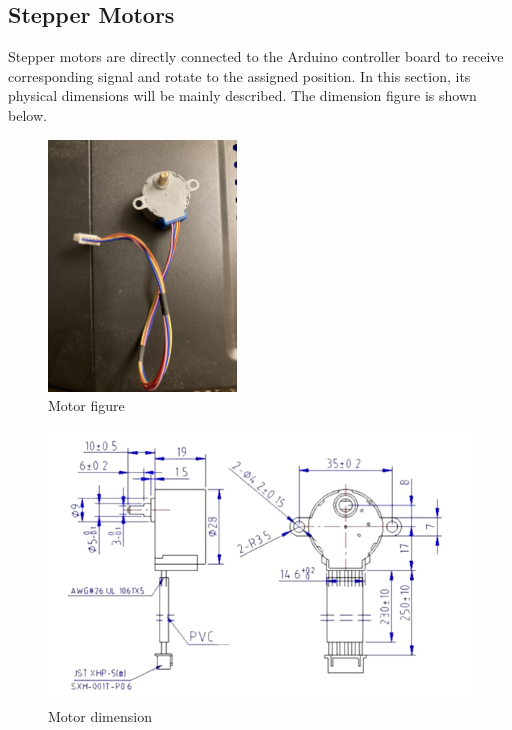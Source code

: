 \documentclass[12pt, titlepage]{article}
\begin{document}
\subsection{Stepper Motors}
Stepper motors are directly connected to the Arduino controller board to receive corresponding signal and rotate to the assigned position. In this section, its physical dimensions will be mainly described. The dimension figure is shown below.
\begin{figure}[H]
\caption{Motor figure}
\centering
\includegraphics[width=5cm]{motor_figure.jpg}
\end{figure}
\begin{figure}[H]
\caption{Motor dimension}
\centering
\includegraphics[width=\textwidth]{motor.png}
\end{figure}
\end{document}
